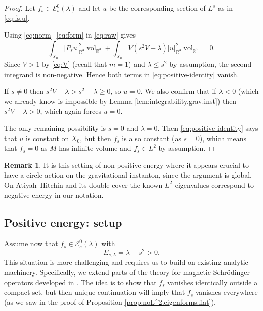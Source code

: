 \documentclass{article}
\theoremstyle{definition}
\newtheorem{rmk}[thm]{Remark}
\numberwithin{thm}{section}
\numberwithin{equation}{section}
\DeclareMathOperator\vol{vol}
\def\R{\mathbb{R}}
\begin{document}
\begin{proof} Let $f_s\in\mathcal{E}^0_s(\lambda)$ and let $u$ be the corresponding section of $L^s$ as in \eqref{eq:fs.u}.

Using \eqref{eq:norm}--\eqref{eq:form} in \eqref{eq:raw} gives
\begin{equation}\label{eq:positive-identity}
        \int_{X_0}|P_su|_{\R^3}^2\vol_{\R^3}
        +\int_{X_0}V(s^2V-\lambda)|u|_{\R^3}^2\vol_{\R^3}=0.
\end{equation}
Since $V>1$ by \eqref{eq:V} (recall that $m=1$) and $\lambda\leq s^2$ by assumption, the second integrand is non-negative.  Hence both terms in \eqref{eq:positive-identity} vanish.

If $s\neq 0$ then $s^2V-\lambda>s^2-\lambda\geq 0$, so $u=0$.  We also confirm that if $\lambda<0$ (which we already know is impossible by Lemma \ref{lem:integrability.grav.inst}) then $s^2V-\lambda>0$, which again forces $u=0$.

 The only remaining possibility is $s=0$ and $\lambda=0$.  Then \eqref{eq:positive-identity} says that $u$ is constant on $X_0$, but then $f_s$ is also constant (as $s=0$), which means that $f_s=0$ as $M$ has infinite volume and $f_s\in L^2$ by assumption.
 \end{proof}

 \begin{rmk}
It is this setting of non-positive energy where it appears crucial to have a  circle action on the gravitational instanton, since the argument is global. On Atiyah--Hitchin and its double cover the known $L^2$ eigenvalues \cite{Schroers3,GibbonsManton} correspond to negative energy in our notation.   
 \end{rmk}

 \subsection{Positive energy: setup}\label{ss:pos.set}

 Assume now that $f_s\in\mathcal{E}^0_{s}(\lambda)$ with
\begin{equation}
        E_{s,\lambda}=\lambda-s^2>0.
\end{equation}
 This situation is more challenging and requires us to build on existing analytic machinery.  Specifically, we extend parts of the theory for magnetic Schr\"odinger operators developed in \cite{AHK}.  The idea is to show that $f_s$ vanishes identically outside a compact set, but then unique continuation will imply that $f_s$ vanishes everywhere (as we saw in the proof of Proposition \ref{prop:noL^2.eigenforms.flat}).
\end{document}
